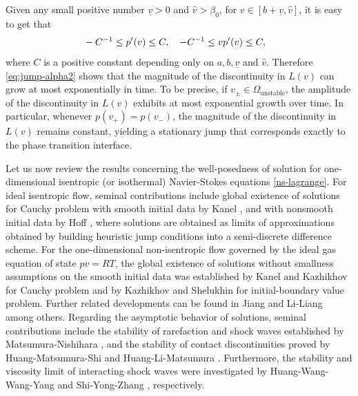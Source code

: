 \documentclass[a4paper,oneside,11pt]{article}
\numberwithin{equation}{section}
\begin{document}
Given any small positive number $\underline{v}>0$ and $\hat{v}>\beta_0$, for $v\in [b+\underline{v}, \hat{v}]$, it is easy to get that
\begin{equation}\label{eq:vvv}
\begin{aligned}
\displaystyle & -C^{-1}\leq p'(v)\leq C,\quad %
-C^{-1}\leq vp'(v)\leq C,
\end{aligned}	
\end{equation}
where $C$ is a positive constant depending only on $a, b, \underline{v}$ and $\hat v$.
Therefore  \eqref{eq:jump-alpha2} shows that the magnitude of the discontinuity in \(L(v)\) can grow at most exponentially in time. 
To be precise, %
if $v_\pm \in \Omega_{\mathrm{unstable}}$, the amplitude of the discontinuity in $L(v)$ exhibits at most exponential growth over time. In particular, whenever $p(v_+) = p(v_-)$, the magnitude of the discontinuity in $L(v)$ remains constant, yielding a stationary jump that corresponds exactly to the phase transition interface.

Let us now review the results concerning the well-posedness of solution for one-dimensional isentropic (or isothermal) Navier-Stokes equations \eqref{ns-lagrange}. For ideal isentropic flow, seminal contributions include global existence of solutions for Cauchy problem with smooth initial data by Kanel \cite{k1968}, and with nonsmooth initial data by Hoff \cite{hoff1986,hoff1987}, where solutions are obtained as limits of approximations obtained by building heuristic jump conditions into a semi-discrete difference scheme. For the one-dimensional non-isentropic flow governed by the ideal gas equation of state $pv = RT$, the global existence of solutions without smallness assumptions on the smooth initial data was established by Kanel \cite{K1979} and Kazhikhov \cite{K1982} for Cauchy problem and by Kazhikhov and Shelukhin \cite{ks1977} for initial-boundary value problem. 
Further related developments can be found in Jiang \cite{J1999} and  Li-Liang \cite{LL2016} among others. Regarding the asymptotic behavior of solutions, seminal contributions include the stability of rarefaction and shock waves established by Matsumura-Nishihara \cite{MN1985, MN1986}, and the stability of contact discontinuities proved by Huang-Matsumura-Shi \cite{HMS2004} and Huang-Li-Matsumura \cite{HLM2010}. Furthermore, the stability and viscosity limit of interacting shock waves were investigated by Huang-Wang-Wang-Yang \cite{HWWY2015} and Shi-Yong-Zhang \cite{SYZ2016}, respectively.
\end{document}
